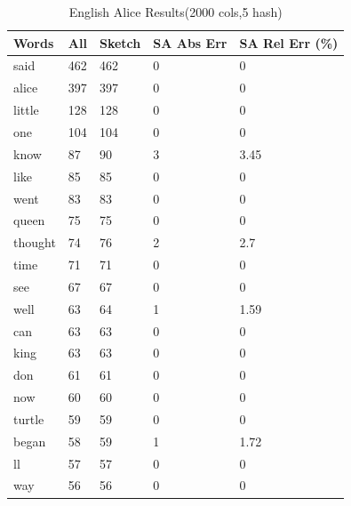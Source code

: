 \documentclass[shortpaper]{revdetua}
\begin{document}
\begin{table}[h]
    \centering
    \begin{tabular}{|l|l|l|l|l|}
    \hline
    Words     & All & Sketch & SA Abs Err & SA Rel Err (\%) \\ \hline
    said    & 462 & 462    & 0           & 0           \\ \hline
    alice   & 397 & 397    & 0           & 0           \\ \hline
    little  & 128 & 128    & 0           & 0           \\ \hline
    one     & 104 & 104    & 0           & 0           \\ \hline
    know    & 87  & 90     & 3           & 3.45        \\ \hline
    like    & 85  & 85     & 0           & 0           \\ \hline
    went    & 83  & 83     & 0           & 0           \\ \hline
    queen   & 75  & 75     & 0           & 0           \\ \hline
    thought & 74  & 76     & 2           & 2.7         \\ \hline
    time    & 71  & 71     & 0           & 0           \\ \hline
    see     & 67  & 67     & 0           & 0           \\ \hline
    well    & 63  & 64     & 1           & 1.59        \\ \hline
    can     & 63  & 63     & 0           & 0           \\ \hline
    king    & 63  & 63     & 0           & 0           \\ \hline
    don     & 61  & 61     & 0           & 0           \\ \hline
    now     & 60  & 60     & 0           & 0           \\ \hline
    turtle  & 59  & 59     & 0           & 0           \\ \hline
    began   & 58  & 59     & 1           & 1.72        \\ \hline
    ll      & 57  & 57     & 0           & 0           \\ \hline
    way     & 56  & 56     & 0           & 0           \\ \hline
    \end{tabular}
    \caption{English Alice Results(2000 cols,5 hash)}
    \label{tab:alice2000_5}
\end{table}
\end{document}

